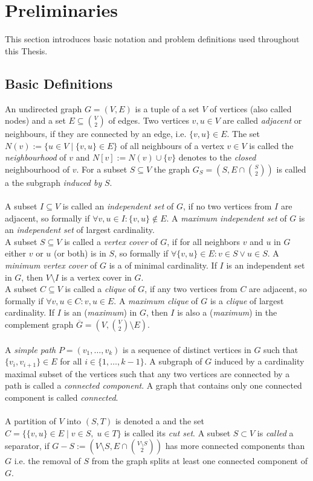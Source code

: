 \documentclass[]{article}
\begin{document}
\section{Preliminaries} \label{sec2}

This section introduces basic notation and problem definitions used throughout this Thesis.

\subsection{Basic Definitions}

An undirected graph $G=(V,E)$ is a tuple of a set $V$ of vertices (also called nodes) and a set $E\subseteq \binom{V}{2}$ of edges. Two vertices $v,u\in V$ are called \textit{adjacent} or neighbours, if they are connected by an edge, i.e. $\{v,u\}\in E$. The set $N(v) := \{u \in V\;|\; \{v,u\}\in E \}$ of all neighbours of a vertex $v\in V$ is called the \textit{neighbourhood} of $v$ and $N[v] := N(v) \cup \{v\}$ denotes to the \textit{closed} neighbourhood of $v$. For a subset $S\subseteq V$ the graph $G_S=(S, E\cap\binom{S}{2})$ is called a
the subgraph \textit{induced by} $S$.\\\\
A subset $I\subseteq V$ is called an \textit{independent set} of $G$, if no two vertices from $I$ are adjacent, so formally if $\forall v,u\in I: \{v,u\}\notin E$. A \textit{maximum independent set} of $G$ is an \textit{independent set} of largest cardinality.\\
A subset $S\subseteq V$ is called a \textit{vertex cover} of $G$, if for all neighbors $v$ and $u$ in $G$ either $v$ or $u$ (or both) is in $S$, so formally if $\forall \{v,u\}\in E: v\in S \vee u\in S$. A \textit{minimum vertex cover} of $G$ is a  of minimal cardinality. If $I$ is an independent set in $G$, then $V\setminus I$ is a vertex cover in $G$.\\
A subset $C\subseteq V$ is called a \textit{clique} of $G$, if any two vertices from $C$ are adjacent, so formally if $\forall v,u\in C:{v,u}\in E$. A \textit{maximum clique} of $G$ is a \textit{clique} of largest cardinality. If $I$ is an (\textit{maximum})  in $G$, then $I$ is also a (\textit{maximum})  in the complement graph $\overline{G}=(V, \binom{V}{2}\setminus E)$.\\\\
A \textit{simple path} $P=(v_1,\dots,v_k)$ is a sequence of distinct vertices in $G$ such that $\{v_i,v_{i+1}\}\in E$ for all $i \in \{1,\dots,k-1\}$. A subgraph of $G$ induced by a cardinality maximal subset of the vertices such that any two vertices are connected by a path is called a \textit{connected component}. A graph that contains only one connected component is called \textit{connected}. \\\\
A partition of $V$ into $(S,T)$ is denoted a  and the set $C = \{\{v,u\}\in E\;|\;v\in S,\; u\in T\}$ is called its \textit{cut set}. A subset $S\subset V$ is \textit{called} a separator, if $G-S := (V\setminus S, E\cap\binom{V\setminus S}{2})$ has more connected components than $G$ i.e. the removal of $S$ from the graph splits at least one connected component of $G$.
\end{document}
